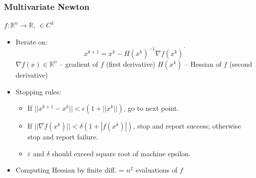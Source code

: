 \documentclass[bigger]{beamer}
\begin{document}
\begin{frame}%

\frametitle{Multivariate Newton}

$f:\mathbb{R}^{n}\mathbb{\rightarrow R}$, $\in C^{3}$

\begin{itemize}
\item Iterate on:%
\begin{equation*}
x^{k+1}=x^{k}-H(x^{k})^{-1}\nabla f(x^{k})^{\prime }
\end{equation*}%
$\nabla f(x)\in \mathbb{R}^{n}$ -- gradient of $f$ (first derivative)\newline
$H(x^{k})$ -- Hessian of $f$ (second derivative)

\item Stopping rules:

\begin{itemize}
\item If $||x^{k+1}-x^{k}||<\epsilon (1+||x^{k}||)$, go to next point.

\item If $||\nabla f(x^{k})||<\delta (1+|f(x^{k})|)$, stop and report
success; otherwise stop and report failure.

\item $\varepsilon $ and $\delta $ should exceed square root of machine
epsilon.
\end{itemize}

\item Computing Hessian by finite diff. = $n^{2}$ evaluations of $f$
\end{itemize}


\end{frame}%
\end{document}
